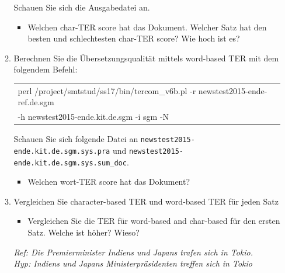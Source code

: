 \documentclass[12pt,fleqn]{article}
\begin{document}
\begin{enumerate}
\begin{enumerate}
\vspace{0.5cm} 
Schauen Sie sich die Ausgabedatei an. 

\vspace{0.5cm} 
\begin{itemize} 
\item Welchen char-TER score hat das Dokument. Welcher Satz hat den besten und schlechtesten char-TER score? Wie hoch ist es? %
\end{itemize} 


\vspace{0.5cm} 
\item Berechnen Sie die Übersetzungsqualität mittels word-based TER mit dem folgendem Befehl:

\vspace{0.5cm} 
\begin{table}[h] 
 \begin{center} 
\begin{tabular}{l} 
perl /project/smtstud/ss17/bin/tercom\_v6b.pl -r newstest2015-ende-ref.de.sgm\\
-h newstest2015-ende.kit.de.sgm -i sgm -N \\ 
\end{tabular}
 \end{center}
\end{table}

\vspace{0.5cm} 
Schauen Sie sich folgende Datei an \texttt{newstest2015-ende.kit.de.sgm.sys.pra} und \texttt{newstest2015-ende.kit.de.sgm.sys.sum\_doc}.
\vspace{0.5cm} 
\begin{itemize} 
\item Welchen wort-TER score hat das Dokument? %
\end{itemize} 

\vspace{0.5cm} 
\item Vergleichen Sie character-based TER und word-based TER für jeden Satz

\vspace{0.5cm} 
\begin{itemize} 
 \item Vergleichen Sie die TER für word-based and char-based für den ersten Satz. Welche ist höher? Wieso? 
\end{itemize}

\vspace{0.5cm} 
\textit{Ref: Die Premierminister Indiens und Japans trafen sich in Tokio. } \\ 
\textit{Hyp: Indiens und Japans Ministerpräsidenten treffen sich in Tokio } \\ 


\end{enumerate}
\end{enumerate}
\end{document}
